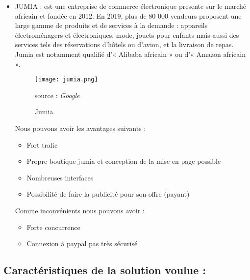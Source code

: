 \begin{itemize}[label=\textbullet, font=\LARGE \color{blue}]
	\item JUMIA : est une entreprise de commerce électronique presente sur le marché africain et fondée en 2012. En 2019, plus de 80 000 vendeurs proposent une large gamme de produits et de services à la demande : appareils électroménagers et électroniques, mode, jouets pour enfants mais aussi des services tels des réservations d'hôtels ou d’avion, et la livraison de repas. Jumia est notamment qualifié d'« Alibaba africain » ou d'« Amazon africain ».
		\begin{figure}[H]
			\centering
			\texttt{[image: jumia.png]}
			\caption{Jumia.}{ \begin{center} source : \textit{Google} \end{center}}
			\label{fig:jumia}
		\end{figure}
		Nous pouvons avoir les avantages suivants :
	\begin{itemize}[label=\textbullet, font=\LARGE \color{black}] 
		\item Fort trafic
		\item Propre boutique jumia et conception de la mise en page possible	
		\item Nombreuses interfaces
		\item Possibilité de faire la publicité pour son offre (payant)
	\end{itemize}
	Comme inconvénients nous pouvons avoir  :
	\begin{itemize}[label=\textbullet, font=\LARGE \color{black}] 
		\item Forte concurrence
		\item Connexion à paypal pas très sécurisé 	
	\end{itemize}
	
\end{itemize}

\subsection{Caractéristiques de la solution voulue :}

